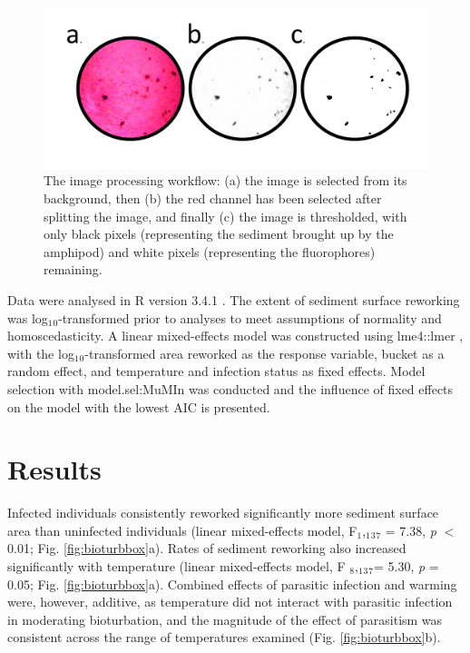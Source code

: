 \begin{figure}[H]
    \centering
    \includegraphics[keepaspectratio,width=\textwidth]{figures/ch3/bioturbprocess.pdf}
  \caption [Bioturbation image amalysis workflow]{The image processing workflow: (a) the image is selected from its background, then (b) the red channel has been selected after splitting the image, and finally (c) the image is thresholded, with only black pixels (representing the sediment brought up by the amphipod) and white pixels (representing the fluorophores) remaining.} 
    \label{fig:bioturbprocess}
\end{figure}

Data were analysed in R version 3.4.1 \citep{r2017}. The extent of sediment surface reworking was log$_1$$_0$-transformed prior to analyses to meet assumptions of normality and homoscedasticity. A linear mixed-effects model was constructed using lme4::lmer \citep{bates2015}, with the log$_1$$_0$-transformed area reworked as the response variable, bucket as a random effect, and temperature and infection status as fixed effects. Model selection with model.sel:MuMIn \citep{barton2018} was conducted and the influence of fixed effects on the model with the lowest AIC is presented.  

\section{Results}

Infected individuals consistently reworked significantly more sediment surface area than uninfected individuals (linear mixed-effects model, F$_1$,$_1$$_3$$_7$ = 7.38, \emph{p} $<$ 0.01;  Fig. \ref{fig:bioturbbox}a). Rates of sediment reworking also increased significantly with temperature (linear mixed-effects model, F $_8$,$_1$$_3$$_7$= 5.30, \emph{p}  = 0.05; Fig. \ref{fig:bioturbbox}a). Combined effects of parasitic infection and warming were, however, additive, as temperature did not interact with parasitic infection in moderating bioturbation, and the magnitude of the effect of parasitism was consistent across the range of temperatures examined (Fig. \ref{fig:bioturbbox}b).

